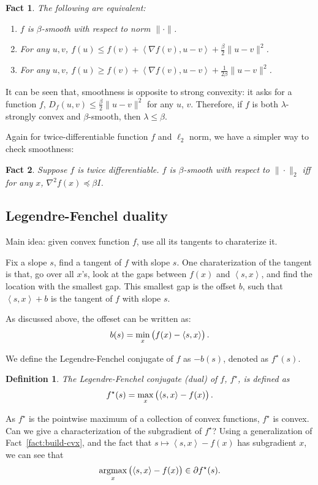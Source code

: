 \documentclass{article}
\newtheorem{definition}{Definition}
\newtheorem{fact}{Fact}
\DeclareMathOperator*{\argmax}{{\rm argmax}}
\newcommand{\inner}[2]{\left\langle #1,#2 \right\rangle}
\begin{document}
\begin{fact}
The following are equivalent:
\begin{enumerate}
  \item $f$ is $\beta$-smooth with respect to norm $\| \cdot \|$.
  \item For any $u, v$, $f(u) \leq f(v) + \inner{\nabla f(v)}{u - v} + \frac{\beta}{2}\| u - v \|^2$.
  \item For any $u, v$, $f(u) \geq f(v) + \inner{\nabla f(v)}{u - v} + \frac{1}{2\beta} \| u - v \|^2$.
\end{enumerate}
\end{fact}

It can be seen that, smoothness is opposite to strong convexity: it asks for a function $f$, $D_f(u, v) \leq \frac{\beta}{2}\| u - v\|^2$ for any $u$, $v$. Therefore, if $f$ is both $\lambda$-strongly convex and $\beta$-smooth, then $\lambda \leq \beta$.

Again for twice-differentiable function $f$ and $\ell_2$ norm, we have a simpler way
to check smoothness:
\begin{fact}
Suppose $f$ is twice differentiable.
$f$ is $\beta$-smooth with respect to $\| \cdot \|_2$ iff for any $x$,
$\nabla^2 f(x) \preceq \beta I$.
\end{fact}

\subsection{Legendre-Fenchel duality}

Main idea: given convex function $f$, use all its tangents to charaterize it.

Fix a slope $s$, find a tangent of $f$ with slope $s$. One charaterization of the tangent is that, go over all $x$'s, look at the gaps between $f(x)$ and $\inner{s}{x}$, and find the location with the smallest gap. This smallest gap is the offset $b$, such that $\inner{s}{x} + b$ is the tangent of $f$ with slope $s$.

As discussed above, the offeset can be written as:
\[ b(s) =  \min_x \del{f(x) - \inner{s}{x}}. \]

We define the Legendre-Fenchel conjugate of $f$ as $-b(s)$, denoted as $f^\star(s)$. \begin{definition}
The Legendre-Fenchel conjugate (dual) of $f$, $f^\star$, is defined as
\[ f^\star(s) = \max_{x} \del{\inner{s}{x} - f(x)}. \]
\end{definition}
As $f^\star$ is the pointwise maximum of a collection of convex functions, $f^\star$ is convex. Can we give a characterization of the subgradient of $f^\star$? Using a generalization of Fact~\ref{fact:build-cvx}, and the fact that $s \mapsto \inner{s}{x} - f(x)$ has subgradient $x$,
we can see that
\[ \argmax_{x} \del{\inner{s}{x} - f(x)} \in \partial f^\star (s). \]
\end{document}
